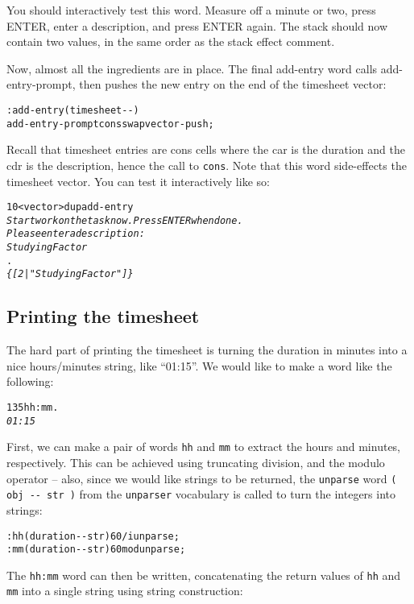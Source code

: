 \documentclass[english]{article}
\begin{document}
{You should interactively test this word. Measure off a minute or two,
press ENTER, enter a description, and press ENTER again. The stack
should now contain two values, in the same order as the stack effect
comment.

Now, almost all the ingredients are in place. The final add-entry
word calls add-entry-prompt, then pushes the new entry on the end
of the timesheet vector:

\begin{alltt}
: add-entry ( timesheet -{}- )
    add-entry-prompt cons swap vector-push ;
\end{alltt}

Recall that timesheet entries are cons cells where the car is the
duration and the cdr is the description, hence the call to \texttt{cons}.
Note that this word side-effects the timesheet vector. You can test
it interactively like so:

\begin{alltt}
10 <vector> dup add-entry
\emph{Start work on the task now. Press ENTER when done.}
\emph{Please enter a description:}
\emph{Studying Factor}
.
\emph{\{ {[} 2 | "Studying Factor" {]} \}}
\end{alltt}

\subsection{Printing the timesheet}

The hard part of printing the timesheet is turning the duration in
minutes into a nice hours/minutes string, like {}``01:15''. We would
like to make a word like the following:

\begin{alltt}
135 hh:mm .
\emph{01:15}
\end{alltt}

First, we can make a pair of words \texttt{hh} and \texttt{mm} to extract the hours
and minutes, respectively. This can be achieved using truncating division,
and the modulo operator -- also, since we would like strings to be
returned, the \texttt{unparse} word \texttt{( obj -{}- str )} from
the \texttt{unparser} vocabulary is called to turn the integers into
strings:

\begin{alltt}
: hh ( duration -{}- str ) 60 /i unparse ;
: mm ( duration -{}- str ) 60 mod unparse ;
\end{alltt}

The \texttt{hh:mm} word can then be written, concatenating the return
values of \texttt{hh} and \texttt{mm} into a single string using string
construction:

}
\end{document}
